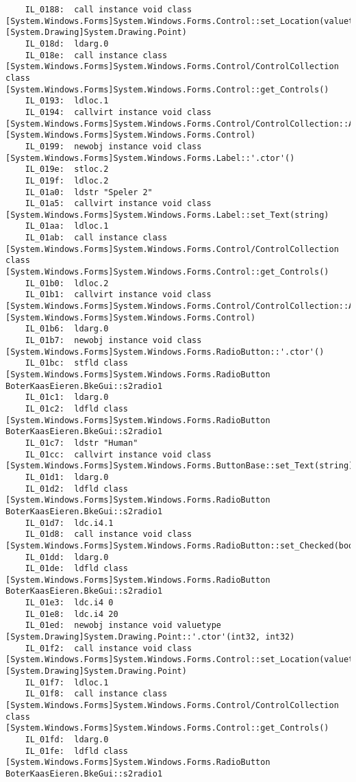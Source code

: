 \begin{lstlisting}
	IL_0188:  call instance void class [System.Windows.Forms]System.Windows.Forms.Control::set_Location(valuetype [System.Drawing]System.Drawing.Point)
	IL_018d:  ldarg.0 
	IL_018e:  call instance class [System.Windows.Forms]System.Windows.Forms.Control/ControlCollection class [System.Windows.Forms]System.Windows.Forms.Control::get_Controls()
	IL_0193:  ldloc.1 
	IL_0194:  callvirt instance void class [System.Windows.Forms]System.Windows.Forms.Control/ControlCollection::Add(class [System.Windows.Forms]System.Windows.Forms.Control)
	IL_0199:  newobj instance void class [System.Windows.Forms]System.Windows.Forms.Label::'.ctor'()
	IL_019e:  stloc.2 
	IL_019f:  ldloc.2 
	IL_01a0:  ldstr "Speler 2"
	IL_01a5:  callvirt instance void class [System.Windows.Forms]System.Windows.Forms.Label::set_Text(string)
	IL_01aa:  ldloc.1 
	IL_01ab:  call instance class [System.Windows.Forms]System.Windows.Forms.Control/ControlCollection class [System.Windows.Forms]System.Windows.Forms.Control::get_Controls()
	IL_01b0:  ldloc.2 
	IL_01b1:  callvirt instance void class [System.Windows.Forms]System.Windows.Forms.Control/ControlCollection::Add(class [System.Windows.Forms]System.Windows.Forms.Control)
	IL_01b6:  ldarg.0 
	IL_01b7:  newobj instance void class [System.Windows.Forms]System.Windows.Forms.RadioButton::'.ctor'()
	IL_01bc:  stfld class [System.Windows.Forms]System.Windows.Forms.RadioButton BoterKaasEieren.BkeGui::s2radio1
	IL_01c1:  ldarg.0 
	IL_01c2:  ldfld class [System.Windows.Forms]System.Windows.Forms.RadioButton BoterKaasEieren.BkeGui::s2radio1
	IL_01c7:  ldstr "Human"
	IL_01cc:  callvirt instance void class [System.Windows.Forms]System.Windows.Forms.ButtonBase::set_Text(string)
	IL_01d1:  ldarg.0 
	IL_01d2:  ldfld class [System.Windows.Forms]System.Windows.Forms.RadioButton BoterKaasEieren.BkeGui::s2radio1
	IL_01d7:  ldc.i4.1 
	IL_01d8:  call instance void class [System.Windows.Forms]System.Windows.Forms.RadioButton::set_Checked(bool)
	IL_01dd:  ldarg.0 
	IL_01de:  ldfld class [System.Windows.Forms]System.Windows.Forms.RadioButton BoterKaasEieren.BkeGui::s2radio1
	IL_01e3:  ldc.i4 0
	IL_01e8:  ldc.i4 20
	IL_01ed:  newobj instance void valuetype [System.Drawing]System.Drawing.Point::'.ctor'(int32, int32)
	IL_01f2:  call instance void class [System.Windows.Forms]System.Windows.Forms.Control::set_Location(valuetype [System.Drawing]System.Drawing.Point)
	IL_01f7:  ldloc.1 
	IL_01f8:  call instance class [System.Windows.Forms]System.Windows.Forms.Control/ControlCollection class [System.Windows.Forms]System.Windows.Forms.Control::get_Controls()
	IL_01fd:  ldarg.0 
	IL_01fe:  ldfld class [System.Windows.Forms]System.Windows.Forms.RadioButton BoterKaasEieren.BkeGui::s2radio1

\end{lstlisting}
